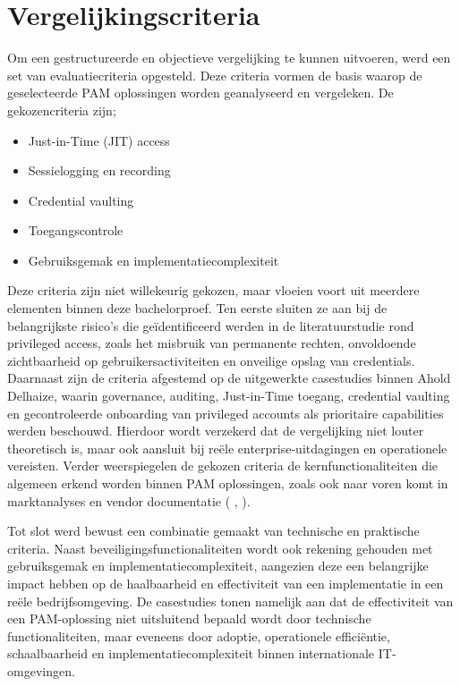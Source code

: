 \section{Vergelijkingscriteria}
Om een gestructureerde en objectieve vergelijking te kunnen uitvoeren, werd een set van evaluatiecriteria opgesteld. Deze criteria vormen de basis waarop de geselecteerde PAM oplossingen worden geanalyseerd en vergeleken.
De gekozencriteria zijn;
\begin{itemize}
	\item Just-in-Time (JIT) access
	\item Sessielogging en recording
	\item Credential vaulting
	\item Toegangscontrole
	\item Gebruiksgemak en implementatiecomplexiteit 
\end{itemize}
Deze criteria zijn niet willekeurig gekozen, maar vloeien voort uit meerdere elementen binnen deze bachelorproef.
Ten eerste sluiten ze aan bij de belangrijkste risico’s die geïdentificeerd werden in de literatuurstudie rond privileged access, zoals het misbruik van permanente rechten, onvoldoende zichtbaarheid op gebruikersactiviteiten en onveilige opslag van credentials.
Daarnaast zijn de criteria afgestemd op de uitgewerkte casestudies binnen Ahold Delhaize, waarin governance, auditing, Just-in-Time toegang, credential vaulting en gecontroleerde onboarding van privileged accounts als prioritaire capabilities werden beschouwd. Hierdoor wordt verzekerd dat de vergelijking niet louter theoretisch is, maar ook aansluit bij reële enterprise-uitdagingen en operationele vereisten. Verder weerspiegelen de gekozen criteria de kernfunctionaliteiten die algemeen erkend worden binnen PAM oplossingen, zoals ook naar voren komt in marktanalyses en vendor documentatie (\cite{ForresterWavePIM2025} \cite{KuppingerColePAM2024}, \cite{GartnerMagicQuadrantPAM2025}).

Tot slot werd bewust een combinatie gemaakt van technische en praktische criteria. Naast beveiligingsfunctionaliteiten wordt ook rekening gehouden met gebruiksgemak en implementatiecomplexiteit, aangezien deze een belangrijke impact hebben op de haalbaarheid en effectiviteit van een implementatie in een reële bedrijfsomgeving. De casestudies tonen namelijk aan dat de effectiviteit van een PAM-oplossing niet uitsluitend bepaald wordt door technische functionaliteiten, maar eveneens door adoptie, operationele efficiëntie, schaalbaarheid en implementatiecomplexiteit binnen internationale IT-omgevingen.

